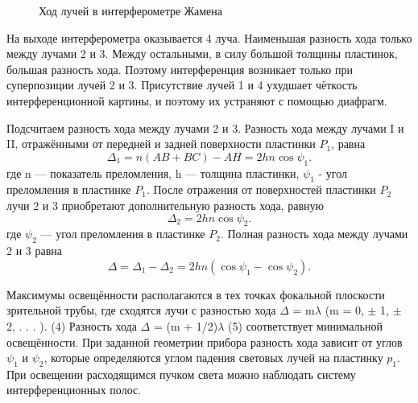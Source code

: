 \documentclass[a4paper, 12pt]{article}%
\begin{document}
	\begin{figure}[H]
		\caption{Ход лучей в интерферометре Жамена}
	\end{figure}
	
	На выходе интерферометра оказывается 4 луча. Наименьшая разность хода только между лучами 2 и 3. Между остальными, в силу большой толщины пластинок, большая разность хода. Поэтому интерференция возникает только при суперпозиции лучей 2 и 3. Присутствие лучей 1 и 4 ухудшает чёткость интерференционной картины, и поэтому их устраняют с помощью диафрагм.
	
	Подсчитаем разность хода между лучами 2 и 3. Разность хода между лучами I и II, отражёнными от передней и задней поверхности пластинки $P_1$, равна
	\begin{equation}
	\Delta_1 = n(AB + BC) - AH = 2hn \cos \psi_1.
	\end{equation}
	где n — показатель преломления, h — толщина пластинки, $\psi_1$ - угол преломления в пластинке $P_1$. После отражения от поверхностей пластинки
	$P_2$ лучи 2 и 3 приобретают дополнительную разность хода, равную
	\begin{equation}
	\Delta_2 = 2hn\cos \psi_2.
	\end{equation} 
	где $\psi_2$ — угол преломления в пластинке $P_2$. Полная разность хода между
	лучами 2 и 3 равна
	\begin{equation}
	\Delta = \Delta_1 - \Delta_2 = 2hn(\cos \psi_1 - \cos \psi_2).
	\end{equation}
	
	Максимумы освещённости располагаются в тех точках
	фокальной плоскости зрительной трубы, где сходятся лучи с разностью
	хода
	$\Delta$ = m$\lambda$ (m = 0, $\pm$ 1, $\pm$ 2, . . . ). (4)
	Разность хода
	$\Delta$ = (m + 1/2)$\lambda$ (5)
	соответствует минимальной освещённости.
	При заданной геометрии прибора разность хода зависит от углов $\psi_1$
	и $\psi_2$, которые определяются углом падения световых лучей на пластинку $p_1$. При освещении расходящимся пучком света можно наблюдать систему интерференционных полос.
	
\end{document}

